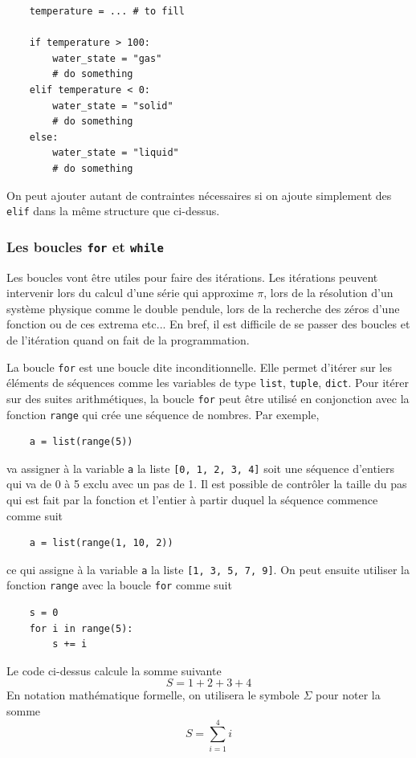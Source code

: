 \documentclass[titlepage]{article}
\theoremstyle{cleanremark}
\begin{document}
\begin{verbatim}
    temperature = ... # to fill

    if temperature > 100:
        water_state = "gas"
        # do something 
    elif temperature < 0:
        water_state = "solid"
        # do something
    else:
        water_state = "liquid"
        # do something
\end{verbatim}

On peut ajouter autant de contraintes nécessaires si on 
ajoute simplement des \texttt{elif} dans la même structure que ci-dessus. 

\subsubsection{Les boucles \texttt{for} et \texttt{while}}
Les boucles vont être utiles pour faire des itérations. Les itérations peuvent intervenir 
lors du calcul d'une série qui approxime $\pi$, lors de la résolution d'un système physique comme le double pendule,
lors de la recherche des zéros d'une fonction ou de ces extrema etc... En bref, il est difficile de se 
passer des boucles et de l'itération quand on fait de la programmation.



La boucle \texttt{for} est une boucle dite inconditionnelle. Elle permet d'itérer 
sur les éléments de séquences comme les variables de type \texttt{list}, \texttt{tuple}, \texttt{dict}.
Pour itérer sur des suites arithmétiques, la boucle \texttt{for} peut être utilisé en conjonction
avec la fonction \texttt{range} qui crée une séquence de nombres. Par exemple,
\begin{verbatim}
    a = list(range(5))
\end{verbatim}
va assigner à la variable \texttt{a} la liste \texttt{[0, 1, 2, 3, 4]} soit une séquence d'entiers qui va de 0 à 5 exclu avec un pas de 1.
Il est possible de contrôler la taille du pas qui est fait par la fonction et l'entier à partir duquel la séquence commence comme suit
\begin{verbatim}
    a = list(range(1, 10, 2))
\end{verbatim}
ce qui assigne à la variable \texttt{a} la liste \texttt{[1, 3, 5, 7, 9]}. 
On peut ensuite utiliser la fonction \texttt{range} avec la boucle \texttt{for} comme suit
\begin{verbatim}
    s = 0
    for i in range(5):
        s += i
\end{verbatim}
Le code ci-dessus calcule la somme suivante
\begin{equation*}
    S = 1+2+3+4
\end{equation*}
En notation mathématique formelle, on utilisera le symbole $\Sigma$ pour noter la somme
\begin{equation*}
S = \sum_{i=1}^ {4} i
\end{equation*}
\end{document}
